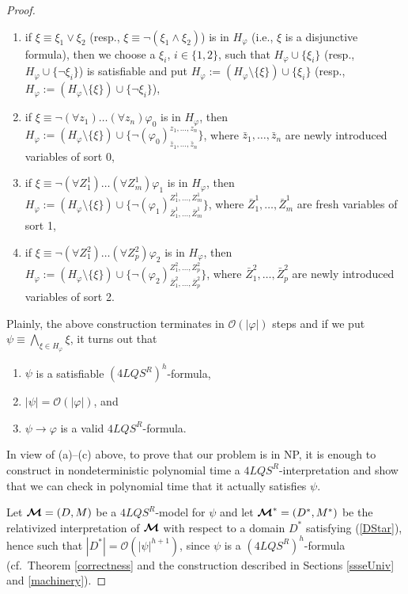 \documentclass{fundam}
\renewcommand{\And}{\wedge}
\newcommand{\Or}{\vee}
\newcommand{\Hf}{H_{\varphi}}
\newcommand{\model}{\ensuremath{\mbox{\boldmath $\mathcal{M}$}}\xspace}
\newcommand{\QLQSR}{\ensuremath{\mbox{$4\mathit{LQS}^{R}$}}\xspace}
\begin{document}
\begin{proof}
\begin{enumerate}[~~R1:]
\item if $\xi \equiv \xi_1 \Or \xi_2$ (resp., $\xi \equiv \neg (\xi_1
\And \xi_2)$) is in $\Hf$ (i.e., $\xi$ is a disjunctive formula), then
we choose a $\xi_i$, $i \in \{1,2\}$, such that $H_{\varphi}\cup
\{\xi_i\}$ (resp., $H_{\varphi}\cup
\{\neg\xi_i\}$)
is satisfiable and put $\Hf := (\Hf \setminus \{\xi\}) \cup
\{\xi_i\}$ (resp., $\Hf := (\Hf \setminus \{\xi\}) \cup
\{\neg\xi_i\}$),

\item if $\xi \equiv \neg(\forall z_1)\ldots (\forall z_n)\varphi_0$
is in $\Hf$, then $\Hf := (\Hf \setminus \{\xi\}) \cup
\{\neg(\varphi_0)_{\bar{z}_1,\ldots,\bar{z}_n}^{z_1,\ldots,z_n}\}$,
where $\bar{z}_1,\ldots,\bar{z}_n$ are newly introduced variables of
sort 0,

\item if $\xi \equiv \neg(\forall Z_1^1)\ldots (\forall Z_m^1)\varphi_1$
is in $\Hf$, then $\Hf := (\Hf \setminus \{\xi\}) \cup
\{\neg(\varphi_1)_{\bar{Z}_1^1,\ldots,\bar{Z}_m^1}^{Z_1^1,\ldots,Z_m^1}\}$,
where $\bar{Z}_1^1,\ldots,\bar{Z}_m^1$ are fresh variables of sort 1,

\item if $\xi \equiv \neg(\forall Z_1^2)\ldots (\forall
Z_p^2)\varphi_2$ is in $\Hf$, then $\Hf := (\Hf \setminus \{\xi\})
\cup
\{\neg(\varphi_2)_{\bar{Z}_1^2,\ldots,\bar{Z}_p^2}^{Z_1^2,\ldots,Z_p^2}\}$,
where $\bar{Z}_1^2,\ldots,\bar{Z}_p^2$ are newly introduced variables
of sort 2.
\end{enumerate}
Plainly, the above construction terminates in $\mathcal{O}(|\varphi|)$
steps and if we put $\psi \equiv \bigwedge_{\xi \in \Hf}\xi$, it turns
out that
\begin{enumerate}[~~~~(a)]
\item $\psi$ is a satisfiable $(\QLQSR)^h$-formula,

\item $|\psi| = \mathcal{O}(|\varphi|)$, and

\item $\psi \rightarrow \varphi$ is a valid $\QLQSR$-formula.
\end{enumerate}
In view of (a)--(c) above, to prove that our problem is in
\textsf{NP}, it is enough to construct in nondeterministic polynomial
time a $\QLQSR$-interpretation and show that we can check in polynomial
time that it actually satisfies $\psi$.

Let $\model = (D,M)$ be a $\QLQSR$-model for $\psi$ and let $\model^*
= (D^*,M^*)$ be the relativized interpretation of $\model$ with respect
to a domain $D^{*}$ satisfying (\ref{DStar}), hence such that
$|D^{*}| = \mathcal{O}(|\psi|^{h+1})$, since $\psi$ is a
$(\QLQSR)^h$-formula (cf.\ Theorem \ref{correctness} and the
construction described in Sections \ref{ssseUniv} and \ref{machinery}).


\end{proof}
\end{document}
